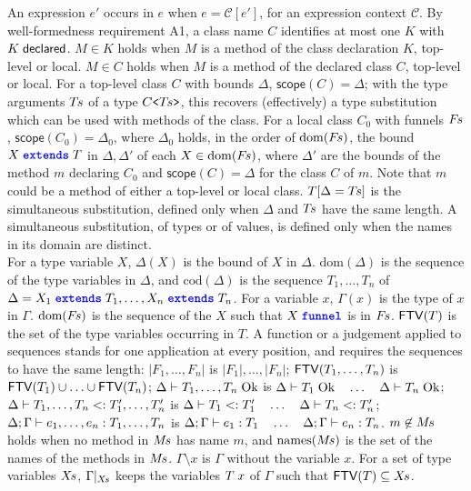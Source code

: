 An expression $e'$ occurs in $e$ when $e=\mathcal{C}[e']$, for an expression context $\mathcal{C}$.
By well-formedness requirement A1, a class name $C$ identifies at most one $K$ with $K\mskip5mu\mathsf{declared}$.
$M\in K$ holds when $M$ is a method of the class declaration $K$, top-level or local.
$M\in C$ holds when $M$ is a method of the declared class $C$, top-level or local.
For a top-level class $C$ with bounds $\Delta$, $\mathsf{scope}(C)=\Delta$; with the type arguments $T\mkern-2mu s$ of a type $C\text{\ttfamily <}T\mkern-2mu s\text{\ttfamily >}$, this recovers (effectively) a type substitution which can be used with methods of the class.
For a local class $C_0$ with funnels $F\mkern-2mu s$, $\mathsf{scope}(C_0)=\Delta_0$, where $\Delta_0$ holds, in the order of $\mathrm{dom}(F\mkern-2mu s)$, the bound $X\mskip5mu\text{\ttfamily\bfseries\color{blue}extends}\mskip5mu T$ in $\Delta,\Delta'$ of each $X\in\mathrm{dom}(F\mkern-2mu s)$, where $\Delta'$ are the bounds of the method $m$ declaring $C_0$ and $\mathsf{scope}(C)=\Delta$ for the class $C$ of $m$. Note that $m$ could be a method of either a top-level or local class.
$T[\Delta=T\mkern-2mu s]$ is the simultaneous substitution, defined only when $\Delta$ and $T\mkern-2mu s$ have the same length.
A simultaneous substitution, of types or of values, is defined only when the names in its domain are distinct.
\\[1ex]
For a type variable $X$, $\Delta(X)$ is the bound of $X$ in $\Delta$.
$\mathrm{dom}(\Delta)$ is the sequence of the type variables in $\Delta$, and $\mathrm{cod}(\Delta)$ is the sequence $T_1,\ldots,T_n$ of $\Delta=X_1\mskip5mu\text{\ttfamily\bfseries\color{blue}extends}\mskip5mu T_1,\ldots,X_n\mskip5mu\text{\ttfamily\bfseries\color{blue}extends}\mskip5mu T_n$.
For a variable $x$, $\Gamma(x)$ is the type of $x$ in $\Gamma$.
$\mathrm{dom}(F\mkern-2mu s)$ is the sequence of the $X$ such that $X\mskip5mu\text{\ttfamily\bfseries\color{blue}funnel}$ is in $F\mkern-2mu s$.
$\mathsf{FTV}(T)$ is the set of the type variables occurring in $T$.
A function or a judgement applied to sequences stands for one application at every position, and requires the sequences to have the same length:
$|F_1,\ldots,F_n|$ is $|F_1|,\ldots,|F_n|$;
$\mathsf{FTV}(T_1,\ldots,T_n)$ is $\mathsf{FTV}(T_1)\cup\ldots\cup\mathsf{FTV}(T_n)$;
$\Delta \vdash T_1,\ldots,T_n\mskip5mu\mathrm{Ok}$ is $\Delta \vdash T_1\mskip5mu\mathrm{Ok}\quad\ldots\quad\Delta \vdash T_n\mskip5mu\mathrm{Ok}$;
$\Delta\vdash T_1,\ldots,T_n <: T'_1,\ldots,T'_n$ is $\Delta\vdash T_1 <: T'_1\quad\ldots\quad\Delta\vdash T_n <: T'_n$;
$\Delta;\Gamma\vdash e_1,\ldots,e_n : T_1,\ldots,T_n$ is $\Delta;\Gamma\vdash e_1 : T_1\quad\ldots\quad\Delta;\Gamma\vdash e_n : T_n$.
$m\not\in M\mkern-2mu s$ holds when no method in $M\mkern-2mu s$ has name $m$, and $\mathrm{names}(M\mkern-2mu s)$ is the set of the names of the methods in $M\mkern-2mu s$.
$\Gamma\setminus x$ is $\Gamma$ without the variable $x$.
For a set of type variables $X\mkern-2mu s$, $\Gamma|_{X\mkern-2mu s}$ keeps the variables $T\mskip5mu x$ of $\Gamma$ such that $\mathsf{FTV}(T)\subseteq X\mkern-2mu s$.

